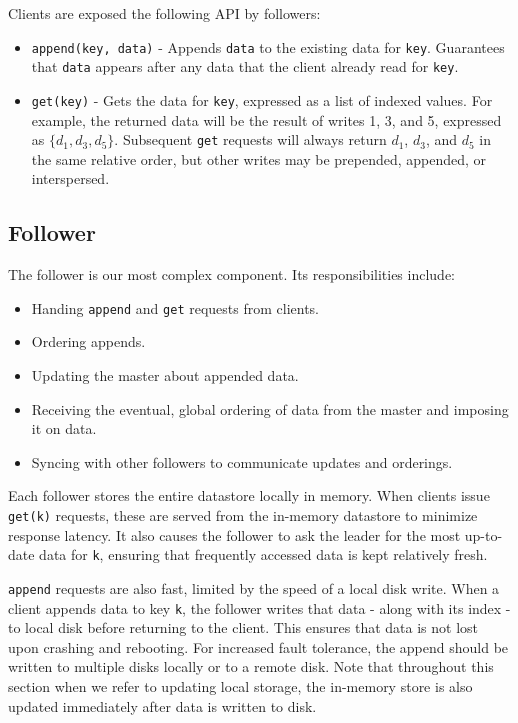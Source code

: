 \documentclass[11pt,english,twocolumn]{article}
\begin{document}
Clients are exposed the following API by followers:
\begin{itemize}
	\item \texttt{append(key, data)} - Appends \texttt{data} to the existing
		data for \texttt{key}. Guarantees that \texttt{data} appears
		after any data that the client already read for \texttt{key}.
	\item \texttt{get(key)} - Gets the data for \texttt{key}, expressed as a
		list of indexed values. For example, the returned data will be
		the result of writes 1, 3, and 5, expressed as $\{d_1, d_3,
		d_5\}$. Subsequent \texttt{get} requests will always return
		$d_1$, $d_3$, and $d_5$ in the same relative order, but other
		writes may be prepended, appended, or interspersed.
\end{itemize}

\subsection{Follower}
The follower is our most complex component. Its responsibilities include:

\begin{itemize}
	\item Handing \texttt{append} and \texttt{get} requests from clients.
	\item Ordering appends.
	\item Updating the master about appended data.
	\item Receiving the eventual, global ordering of data from the master
		and imposing it on data.
	\item Syncing with other followers to communicate updates and orderings.
\end{itemize}

Each follower stores the entire datastore locally in memory. When clients issue
\texttt{get(k)} requests, these are served from the in-memory datastore to minimize
response latency. It also causes the follower to ask the leader for the most
up-to-date data for \texttt{k}, ensuring that frequently accessed data is kept
relatively fresh.

\texttt{append} requests are also fast, limited by the speed of a local disk
write. When a client appends data to key \texttt{k}, the follower writes that
data - along with its index - to local disk before returning to the client. This
ensures that data is not lost upon crashing and rebooting. For increased fault
tolerance, the append should be written to multiple disks locally or to a remote
disk. Note that throughout this section when we refer to updating local storage,
the in-memory store is also updated immediately after data is written to disk.
\end{document}
